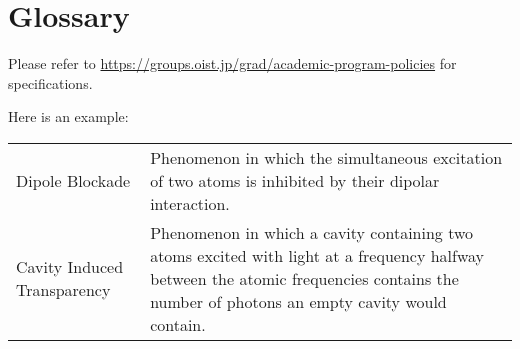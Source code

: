 \chapter*{Glossary}

Please refer to \url{https://groups.oist.jp/grad/academic-program-policies} for specifications.

Here is an example:

\begin{center}
    \begin{longtable}{l p{}}
        Dipole Blockade             & Phenomenon in which the simultaneous excitation of two atoms is inhibited by their dipolar interaction.                                                                                  \\
        Cavity Induced Transparency & Phenomenon in which a cavity containing two atoms excited with light at a frequency halfway between the atomic frequencies contains the number of photons an empty cavity would contain. \\
    \end{longtable}
\end{center}
